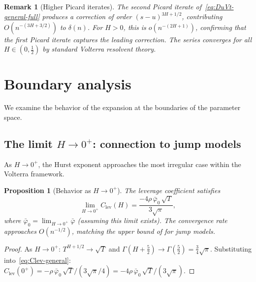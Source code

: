 \documentclass[12pt]{article}
\newtheorem{proposition}[theorem]{Proposition}
\newtheorem{remark}{Remark}
\theoremstyle{definition}
\begin{document}
\begin{remark}[Higher Picard iterates]\label{rem:higher-picard}
The second Picard iterate of~\eqref{eq:DuVt-general-full} produces a
correction of order $(s{-}u)^{3H+1/2}$, contributing
$O(n^{-(3H+3/2)})$ to $\delta(n)$. For $H > 0$, this is
$o(n^{-(2H+1)})$, confirming that the first Picard iterate
captures the leading correction. The series converges for all
$H \in (0,\tfrac12)$ by standard Volterra resolvent theory.
\end{remark}

\section{Boundary analysis}\label{sec:boundary}

We examine the behavior of the expansion at the boundaries of the
parameter space.

\subsection{The limit $H \to 0^+$: connection to jump models}
\label{sec:H-to-0}

As $H \to 0^+$, the Hurst exponent approaches the most irregular
case within the Volterra framework.

\begin{proposition}[Behavior as $H \to 0^+$]\label{prop:H-to-0}
The leverage coefficient satisfies
\begin{equation}\label{eq:H-to-0-Clev}
  \lim_{H\to 0^+} C_{\mathrm{lev}}(H)
  = \frac{-4\rho\,\bar\varphi_0\,\sqrt{T}}{3\sqrt{\pi}},
\end{equation}
where $\bar\varphi_0 = \lim_{H\to 0^+}\bar\varphi$ (assuming
this limit exists). The convergence rate approaches
$O(n^{-1/2})$, matching the upper bound of
\citet{JarrowKchiaProtte2013} for jump models.
\end{proposition}

\begin{proof}
As $H \to 0^+$:
$T^{H+1/2} \to \sqrt{T}$ and
$\Gamma(H+\tfrac52) \to \Gamma(\tfrac52) = \tfrac34\sqrt\pi$.
Substituting into~\eqref{eq:Clev-general}:
$C_{\mathrm{lev}}(0^+)
= -\rho\,\bar\varphi_0\,\sqrt{T}/(3\sqrt{\pi}/4)
= -4\rho\,\bar\varphi_0\,\sqrt{T}/(3\sqrt\pi)$.
\end{proof}
\end{document}
